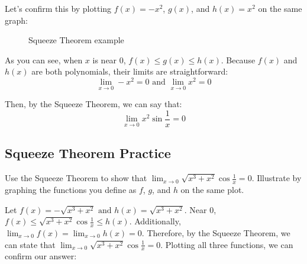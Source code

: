 Let's confirm this by plotting $f(x)=-x^2$, $g(x)$, and $h(x)=x^2$ on the same 
graph:

\begin{figure}[htbp]
\centering

\caption{Squeeze Theorem example}
\end{figure}

As you can see, when $x$ is near $0$, $f(x) \leq g(x) \leq h(x)$. Because $f(x)$ 
and $h(x)$ are both polynomials, their limits are straightforward: $$\lim_{x \to 
0}-x^2 = 0 \text{ and } \lim_{x \to 0}x^2 = 0$$

Then, by the Squeeze Theorem, we can say that: $$\lim_{x \to 0}x^2\sin{\frac{1}{x}}
=0$$

\subsection{Squeeze Theorem Practice}

\begin{Exercise}
[title=Squeeze Theorem 1, label=squeeze1]
    Use the Squeeze Theorem to show that $\lim_{x \to 0}\sqrt{x^3 + x^2}
    \cos{\frac{1}{x}} = 0$. Illustrate by graphing the functions you define as 
    $f$, $g$, and $h$ on the same plot.
    \vspace{100mm}
\end{Exercise}
\begin{Answer}
    [ref=squeeze1]
    Let $f(x) = -\sqrt{x^3+x^2} \text{ and } h(x) = \sqrt{x^3+x^2}$. Near $0$, 
    $f(x) \leq \sqrt{x^3 + x^2}\cos{\frac{1}{x}} \leq h(x)$. Additionally, 
    $\lim_{x \to 0}f(x) = \lim_{x \to 0}h(x) = 0$. Therefore, by the Squeeze 
    Theorem, we can state that $\lim_{x \to 0}\sqrt{x^3 + x^2}\cos{\frac{1}{x}} 
    = 0$. Plotting all three functions, we can confirm our answer:

\end{Answer}

